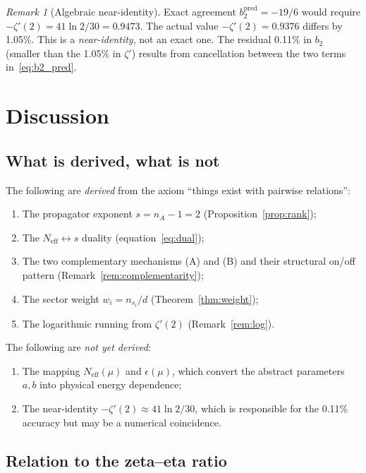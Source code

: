 \documentclass[12pt]{article}
\theoremstyle{definition}
\theoremstyle{remark}
\newtheorem{remark}[theorem]{Remark}
\newcommand{\Neff}{N_{\mathrm{eff}}}
\begin{document}
\begin{remark}[Algebraic near-identity]
Exact agreement $b_2^{\mathrm{pred}} = -19/6$ would require
$-\zeta'(2) = 41\ln 2/30 = 0.9473$.
The actual value $-\zeta'(2) = 0.9376$ differs by 1.05\%.
This is a \emph{near-identity}, not an exact one.
The residual 0.11\% in $b_2$ (smaller than the 1.05\%
in $\zeta'$) results from cancellation between
the two terms in~\eqref{eq:b2_pred}.
\end{remark}

\section{Discussion}
\label{sec:discussion}

\subsection{What is derived, what is not}

The following are \emph{derived} from the axiom
``things exist with pairwise relations'':
\begin{enumerate}
\item The propagator exponent $s = n_A - 1 = 2$
  (Proposition~\ref{prop:rank});
\item The $\Neff \leftrightarrow s$ duality
  (equation~\ref{eq:dual});
\item The two complementary mechanisms (A) and (B)
  and their structural on/off pattern
  (Remark~\ref{rem:complementarity});
\item The sector weight $w_i = n_{s_i}/d$
  (Theorem~\ref{thm:weight});
\item The logarithmic running from $\zeta'(2)$
  (Remark~\ref{rem:log}).
\end{enumerate}

The following are \emph{not yet derived}:
\begin{enumerate}
\item The mapping $\Neff(\mu)$ and $\epsilon(\mu)$,
  which convert the abstract parameters $a, b$
  into physical energy dependence;
\item The near-identity $-\zeta'(2) \approx 41\ln 2/30$,
  which is responsible for the 0.11\% accuracy but
  may be a numerical coincidence.
\end{enumerate}

\subsection{Relation to the zeta--eta ratio}
\end{document}
